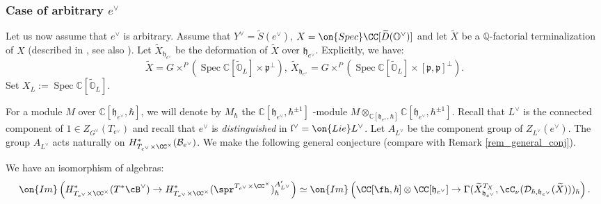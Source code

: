 \documentclass[12pt]{amsart}
\begin{document}
\subsubsection{Case of arbitrary $e^\vee$}
Let us now assume that $e^\vee$ is arbitrary.
Assume that $Y^\vee=\widetilde{S}(e^\vee)$, $X=\on{Spec}\CC[\widetilde{D}(\mathbb{O}^\vee)]$ and let $\widetilde{X}$ be a $\mathbb{Q}$-factorial terminalization of $X$ (described in \cite[Section 7.2]{LMBM}, see also \cite{Namikawa2022}). 
Let $\widetilde{X}_{\mathfrak{h}_{e^\vee}}$ be the deformation of $\widetilde{X}$ over $\mathfrak{h}_{e^\vee}$.
Explicitly, we have:
\begin{equation*}
\widetilde{X} = G \times^P (\operatorname{Spec}\mathbb{C}[\widetilde{\mathbb{O}}_L] \times \mathfrak{p}^\perp),~\widetilde{X}_{\mathfrak{h}_{e^\vee}} = G \times^P (\operatorname{Spec}\mathbb{C}[\widetilde{\mathbb{O}}_L] \times [\mathfrak{p},\mathfrak{p}]^\perp).
\end{equation*}
    Set $X_L:=\operatorname{Spec}\mathbb{C}[\widetilde{\mathbb{O}}_L]$.

For a module $M$ over $\mathbb{C}[\mathfrak{h}_{e^\vee},\hbar]$, we will denote by $M_{\hbar}$ the  $\mathbb{C}[\mathfrak{h}_{e^\vee},\hbar^{\pm 1}]$ -module $M \otimes_{\mathbb{C}[\mathfrak{h}_{e^\vee},\hbar]} 
\mathbb{C}[\mathfrak{h}_{e^\vee},\hbar^{\pm 1}]$. Recall that $L^\vee$ is the connected component of $1 \in Z_{G^\vee}(T_{e^\vee})$ and recall that $e^\vee$ is {\emph{distinguished}} in $\mathfrak{l}^\vee=\on{Lie}L^\vee$. Let $A_{L^\vee}$ be the component group of $Z_{L^\vee}(e^\vee)$. The group $A_{L^\vee}$ acts  naturally on $H^*_{T_{e^\vee} \times \CC^\times}(\mathcal{B}_{e^\vee})$. 
We make the following general conjecture (compare with Remark \ref{rem_general_conj}). 
\begin{conj} \label{image distinguished}
    We have an isomorphism of algebras:
    \begin{multline} 
    \on{Im}\left(H^{*}_{T_{e^\vee} \times \CC^\times}(T^*\cB^\vee) \rightarrow H^{*}_{T_{e^\vee} \times \CC^\times}(\spr^{T_{e^\vee} \times \CC^\times})_{\hbar}^{A'_{L^\vee}}  \right) \simeq 
    \on{Im} \left( \CC[\fh, \hbar] \otimes \CC[\mathfrak{h}_{e^\vee}] \rightarrow \Gamma(\widetilde{X}_{\mathfrak{h}_{e^\vee}}^{T_X},\cC_\nu(\mathcal{D}_{\hbar,\mathfrak{h}_{e^\vee}}(\widetilde{X})))_{\hbar}\right).
    \end{multline}
\end{conj}
\end{document}
